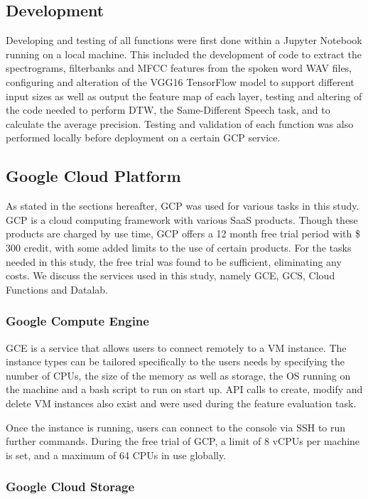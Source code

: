 \subsection{Development}

Developing and testing of all functions were first done within a Jupyter Notebook running on a local machine.
This included the development of code to extract the spectrograms, filterbanks and MFCC features from the spoken word WAV files, configuring and alteration of the VGG16 TensorFlow model to support different input sizes as well as output the feature map of each layer, testing and altering of the code needed to perform DTW, the Same-Different Speech task, and to calculate the average precision.
Testing and validation of each function was also performed locally before deployment on a certain GCP service.

\subsection{Google Cloud Platform}

As stated in the sections hereafter, GCP was used for various tasks in this study.
GCP is a cloud computing framework with various SaaS products.
Though these products are charged by use time, GCP offers a 12 month free trial period with \$ 300 credit, with some added limits to the use of certain products.
For the tasks needed in this study, the free trial was found to be sufficient, eliminating any costs.
We discuss the services used in this study, namely GCE, GCS, Cloud Functions and Datalab.

\subsubsection{Google Compute Engine}

GCE is a service that allows users to connect remotely to a VM instance.
The instance types can be tailored specifically to the users needs by specifying the number of CPUs, the size of the memory as well as storage, the OS running on the machine and a bash script to run on start up.
API calls to create, modify and delete VM instances also exist and were used during the feature evaluation task. 

Once the instance is running, users can connect to the console via SSH to run further commands.
During the free trial of GCP, a limit of 8 vCPUs per machine is set, and a maximum of 64 CPUs in use globally.

\subsubsection{Google Cloud Storage}

